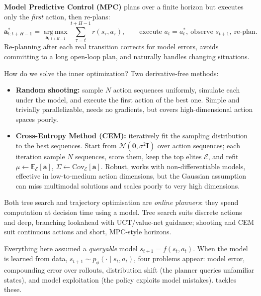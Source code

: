 \documentclass[11pt, oneside]{book}
\newcommand{\E}{\mathbb{E}}              %
\newcommand{\Cov}{\mathrm{Cov}}
\newcommand{\argmax}{\operatorname*{arg\,max}}
\newcommand{\eye}{\mathbf{I}}            %
\newcommand{\Normal}{\mathcal{N}}
\begin{document}
\textbf{Model Predictive Control (MPC)} plans over a finite horizon but executes only the
\emph{first} action, then re-plans:
\[
  \mathbf{a}^*_{t:t+H-1} = \argmax_{\mathbf{a}_{t:t+H-1}} \sum_{\tau=t}^{t+H-1} r(s_\tau, a_\tau),
  \qquad \text{execute } a_t = a^*_t,\ \text{observe } s_{t+1},\ \text{re-plan}.
\]
Re-planning after each real transition corrects for model errors, avoids committing to a
long open-loop plan, and naturally handles changing situations.

How do we solve the inner optimization? Two derivative-free methods:
\begin{itemize}
  \item \textbf{Random shooting:} sample $N$ action sequences uniformly, simulate each under
    the model, and execute the first action of the best one. Simple and trivially
    parallelizable, needs no gradients, but covers high-dimensional action spaces poorly.
  \item \textbf{Cross-Entropy Method (CEM):} iteratively fit the sampling distribution to the
    best sequences. Start from $\Normal(\mathbf{0}, \sigma^2\eye)$ over action sequences;
    each iteration sample $N$ sequences, score them, keep the top elites $\mathcal{E}$, and
    refit $\mu \leftarrow \E_\mathcal{E}[\mathbf{a}]$, $\Sigma \leftarrow \Cov_\mathcal{E}[\mathbf{a}]$.
    Robust, works with non-differentiable models, effective in low-to-medium action
    dimensions, but the Gaussian assumption can miss multimodal solutions and scales poorly
    to very high dimensions.
\end{itemize}

Both tree search and trajectory optimisation are \emph{online planners}: they spend
computation at decision time using a model. Tree search suits discrete actions and deep,
branching lookahead with UCT/value-net guidance; shooting and CEM suit continuous actions
and short, MPC-style horizons.

\begin{notebox}[title={What changes when the model is learned}]
Everything here assumed a \emph{queryable} model $s_{t+1} = f(s_t,a_t)$. When the model is
learned from data, $s_{t+1}\sim p_\phi(\cdot\mid s_t,a_t)$, four problems appear: model
error, compounding error over rollouts, distribution shift (the planner queries unfamiliar
states), and model exploitation (the policy exploits model mistakes). 
tackles these.
\end{notebox}


\end{document}
